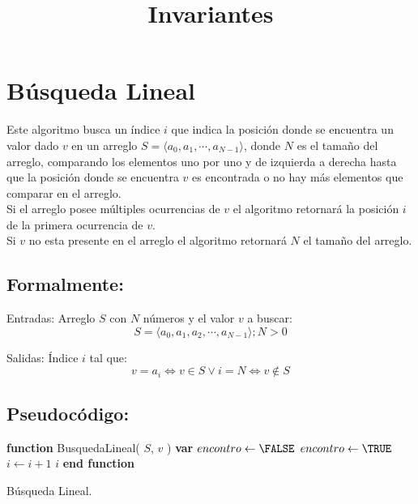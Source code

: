 \documentclass[12pt,spanish]{article}
\title{Invariantes}
\theoremstyle{definition}
\begin{document}

\section{Búsqueda Lineal}{}
Este algoritmo busca un índice $i$ que indica la posición donde se encuentra un valor dado $v$ en un arreglo $S=  \left.\langle a_{0}, a_{1}, \cdots, a_{N-1} \rangle\right.$, donde $N$ es el tamaño del arreglo, comparando los elementos uno por uno y de izquierda a derecha hasta que la posición donde se encuentra $v$ es encontrada o no hay más elementos que comparar en el arreglo.\\
Si el arreglo posee múltiples ocurrencias de $v$ el algoritmo retornará la posición $i$ de la primera ocurrencia de $v$. \\
Si $v$ no esta presente en el arreglo el algoritmo retornará $N$ el tamaño del arreglo.

\subsection{Formalmente:}{}
Entradas: Arreglo $S$ con $N$ números y el valor $v$ a buscar:
\begin{equation}
    S =  \left.\langle a_{0}, a_{1}, a_{2}, \cdots, a_{N-1} \rangle\right.;
    N > 0
\end{equation}

Salidas: Índice $i$ tal que: 
\begin{equation}
     v = a_{i} \Leftrightarrow v \in S \lor i = N  \Leftrightarrow v \notin S
\end{equation}

\subsection{Pseudocódigo:}{}
\begin{algorithm}
\begin{algorithmic}[1]
\STATE \textbf{function} BusquedaLineal( $S$, $v$ ) 
\STATE \textbf{var} $encontro \leftarrow \FALSE$
        \STATE $encontro \leftarrow \TRUE$
    \ENDIF
\STATE $i \leftarrow i + 1$
\ENDFOR
\RETURN $i$
\STATE \textbf{end function}
\caption{Búsqueda Lineal.}
\end{algorithmic}
\end{algorithm}
\end{document}
